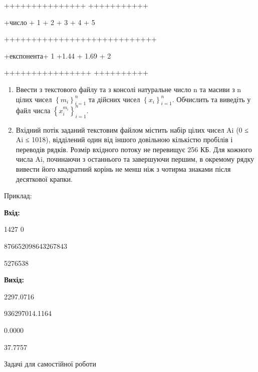 \documentclass[]{article}
\begin{document}
+++++++++++++++ +++++++++++

+число + 1 + 2 + 3 + 4 + 5

++++++++++++++++++++++++++++

+експонента+ 1 +1.44 + 1.69 + 2

++++++++++++++++ ++++++++++

\begin{enumerate}
\def\labelenumi{\arabic{enumi})}
\item
  Ввести з текстового файлу та з консолі натуральне число n та масиви з
  n цілих чисел \(\left\{ m_{i} \right\}_{i = 1}^{n}\) та дійсних чисел
  \(\left\{ x_{i} \right\}_{i = 1}^{n}\). Обчислить та виведіть у файл
  числа \(\left\{ x_{i}^{m_{i}} \right\}_{i = 1}^{n}\).
\item
  Вхідний потік заданий текстовим файлом містить набір цілих чисел Ai (0
  ≤ Ai ≤ 1018), відділений один від іншого довільною кількістю пробілів
  і переводів рядків. Розмір вхідного потоку не перевищує 256 КБ. Для
  кожного числа Ai, починаючи з останнього та завершуючи першим, в
  окремому рядку вивести його квадратний корінь не менш ніж з чотирма
  знаками після десяткової крапки.
\end{enumerate}

Приклад:

\textbf{Вхід:}

1427 0

876652098643267843

5276538

\textbf{Вихід: }

2297.0716

936297014.1164

0.0000

37.7757

Задачі для самостійної роботи
\end{document}
